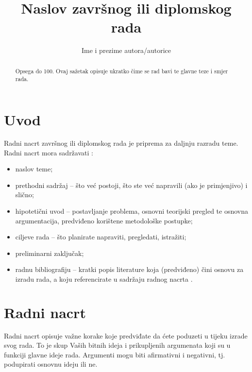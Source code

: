 \documentclass{llncs}
\begin{document}
	\title{Naslov završnog ili diplomskog rada}
	\author{Ime i prezime autora/autorice}
	
	\maketitle
	
	\begin{abstract}
		Opsega do 100. Ovaj sažetak opisuje ukratko čime se rad bavi te glavne teze i smjer rada.
	\end{abstract}
	
	\section{Uvod}
	
	Radni nacrt završnog ili diplomskog rada je priprema za daljnju razradu teme. Radni nacrt mora sadržavati \cite{oraictolic2011AkademskoPismoStrategije}:
	\begin{itemize}
	    \item naslov teme;
	    \item prethodni sadržaj -- što već postoji, što ste već napravili (ako je primjenjivo) i slično;
	    \item hipotetični uvod -- postavljanje problema, osnovni teorijski pregled te osnovna argumentacija, predviđeno korištene metodološke postupke;
	    \item ciljeve rada -- što planirate napraviti, pregledati, istražiti;
	    \item preliminarni zaključak;
	    \item radnu bibliografiju -- kratki popis literature koja (predviđeno) čini osnovu za izradu rada, a koju referencirate u sadržaju radnog nacrta \cite{Russell2010AImodern,okresaduric2019ModellingFormingTemporary}.
	\end{itemize}
	
	
	\section{Radni nacrt}
	
	Radni nacrt opisuje važne korake koje predviđate da ćete poduzeti u tijeku izrade svog rada. To je skup Vaših bitnih ideja i prikupljenih argumenata koji su u funkciji glavne ideje rada. Argumenti mogu biti afirmativni i negativni, tj. podupirati osnovnu ideju ili ne.
	
\end{document}
